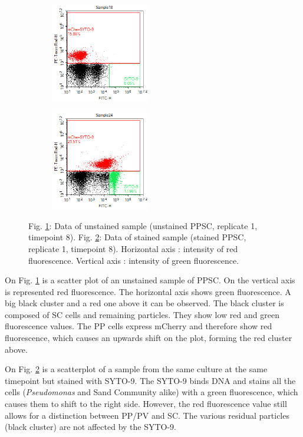 \documentclass[a4paper, 10pt, conference]{ieeeconf}   %
\begin{document}
\begin{figure}
	\hspace{-0.3cm}
	\begin{subfigure}{.25\textwidth}
		\centering
		
		\includegraphics[width=4.3cm]{t8_unstained_ppsc1.png}
		\caption{}
		\label{scatter1}
		
	\end{subfigure}%
	\begin{subfigure}{.22\textwidth}
		\centering
		
		\includegraphics[width=4.3cm]{t8_stained_ppsc1.png}
		\caption{}
		\label{scatter2}
		
	\end{subfigure}
	\caption{Fig. \ref{scatter1}: Data of unstained sample (unstained PPSC, replicate 1, timepoint 8). Fig. \ref{scatter2}: Data of stained sample (stained PPSC, replicate 1, timepoint 8). Horizontal axis : intensity of red fluorescence. Vertical axis : intensity of green fluorescence.}
	\label{scatterplot}
\end{figure}	

On Fig. \ref{scatter1} is a scatter plot of an unstained sample of PPSC. On the vertical axis is represented red fluorescence. The horizontal axis shows green fluorescence. A big black cluster and a red one above it can be observed. The black cluster is composed of SC cells and remaining particles. They show  low red and green fluorescence values. The PP cells express mCherry and therefore show red fluorescence, which causes an upwards shift on the plot, forming the red cluster above.

On Fig. \ref{scatter2} is a scatterplot of a sample from the same culture at the same timepoint but stained with SYTO-9. The SYTO-9 binds DNA and stains all the cells (\textit{Pseudomonas} and Sand Community alike) with a green fluorescence, which causes them to shift to the right side. However, the red fluorescence value still allows for a distinction between PP/PV and SC. The various residual particles (black cluster) are not affected by the SYTO-9. 
\end{document}
